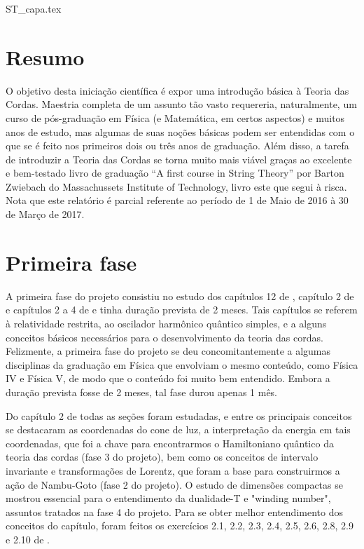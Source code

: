 \documentclass[oneside, 12pt]{article}
\begin{document}
{ST_capa.tex}
 
\pagestyle{mypage2} \normalfont

\section{Resumo}

O objetivo desta iniciação científica é expor uma introdução básica à Teoria das Cordas. Maestria completa de um assunto tão vasto requereria, naturalmente, um curso de pós-graduação em Física (e Matemática, em certos aspectos) e muitos anos de estudo, mas algumas de suas noções básicas podem ser entendidas com o que se é feito nos primeiros dois ou três anos de graduação. Além disso, a tarefa de introduzir a Teoria das Cordas se torna muito mais viável graças ao excelente e bem-testado livro de graduação “A first course in String Theory” por Barton Zwiebach do Massachussets Institute of Technology, livro este que segui à risca. Nota que este relatório é parcial referente ao período de 1 de Maio de 2016 à 30 de Março de 2017. \par 

\section{Primeira fase}

A primeira fase do projeto consistiu no estudo dos capítulos 12 de \cite{griffithseletro}, capítulo 2 de \cite{griffithsqm} e capítulos 2 a 4 de \cite{barton} e tinha duração prevista de 2 meses. Tais capítulos se referem à relatividade restrita, ao oscilador harmônico quântico simples, e a alguns conceitos básicos necessários para o desenvolvimento da teoria das cordas. Felizmente, a primeira fase do projeto se deu concomitantemente a algumas disciplinas da graduação em Física que envolviam o mesmo conteúdo, como Física IV e Física V, de modo que o conteúdo foi muito bem entendido. Embora a duração prevista fosse de 2 meses, tal fase durou apenas 1 mês. \par 

Do capítulo 2 de \cite{barton} todas as seções foram estudadas, e entre os principais conceitos se destacaram as coordenadas do cone de luz, a interpretação da energia em tais coordenadas, que foi a chave para encontrarmos o Hamiltoniano quântico da teoria das cordas (fase 3 do projeto), bem como os conceitos de intervalo invariante e transformações de Lorentz, que foram a base para construirmos a ação de Nambu-Goto (fase 2 do projeto). O estudo de dimensões compactas se mostrou essencial para o entendimento da dualidade-T e "winding number", assuntos tratados na fase 4 do projeto. Para se obter melhor entendimento dos conceitos do capítulo, foram feitos os exercícios 2.1, 2.2, 2.3, 2.4, 2.5, 2.6, 2.8, 2.9 e 2.10 de \cite{barton}.\par 
\end{document}
